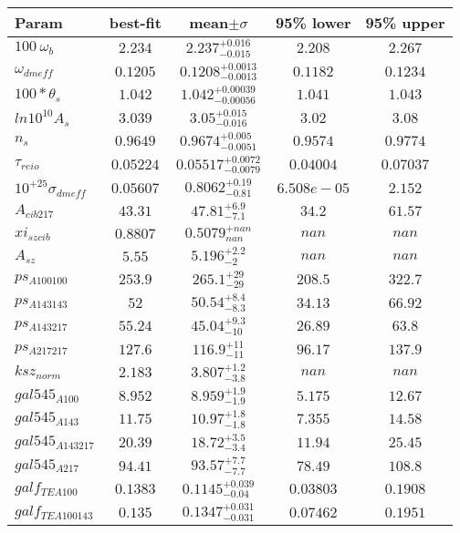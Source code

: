 \begin{tabular}{|l|c|c|c|c|} 
 \hline 
Param & best-fit & mean$\pm\sigma$ & 95\% lower & 95\% upper \\ \hline 
$100~\omega{}_{b }$ &$2.234$ & $2.237_{-0.015}^{+0.016}$ & $2.208$ & $2.267$ \\ 
$\omega{}_{dmeff }$ &$0.1205$ & $0.1208_{-0.0013}^{+0.0013}$ & $0.1182$ & $0.1234$ \\ 
$100*\theta{}_{s }$ &$1.042$ & $1.042_{-0.00056}^{+0.00039}$ & $1.041$ & $1.043$ \\ 
$ln10^{10}A_{s }$ &$3.039$ & $3.05_{-0.016}^{+0.015}$ & $3.02$ & $3.08$ \\ 
$n_{s }$ &$0.9649$ & $0.9674_{-0.0051}^{+0.005}$ & $0.9574$ & $0.9774$ \\ 
$\tau{}_{reio }$ &$0.05224$ & $0.05517_{-0.0079}^{+0.0072}$ & $0.04004$ & $0.07037$ \\ 
$10^{+25}\sigma{}_{dmeff }$ &$0.05607$ & $0.8062_{-0.81}^{+0.19}$ & $6.508e-05$ & $2.152$ \\ 
$A_{cib 217 }$ &$43.31$ & $47.81_{-7.1}^{+6.9}$ & $34.2$ & $61.57$ \\ 
$xi_{sz cib }$ &$0.8807$ & $0.5079_{nan}^{+nan}$ & $nan$ & $nan$ \\ 
$A_{sz }$ &$5.55$ & $5.196_{-2}^{+2.2}$ & $nan$ & $nan$ \\ 
$ps_{A 100 100 }$ &$253.9$ & $265.1_{-29}^{+29}$ & $208.5$ & $322.7$ \\ 
$ps_{A 143 143 }$ &$52$ & $50.54_{-8.3}^{+8.4}$ & $34.13$ & $66.92$ \\ 
$ps_{A 143 217 }$ &$55.24$ & $45.04_{-10}^{+9.3}$ & $26.89$ & $63.8$ \\ 
$ps_{A 217 217 }$ &$127.6$ & $116.9_{-11}^{+11}$ & $96.17$ & $137.9$ \\ 
$ksz_{norm }$ &$2.183$ & $3.807_{-3.8}^{+1.2}$ & $nan$ & $nan$ \\ 
$gal545_{A 100 }$ &$8.952$ & $8.959_{-1.9}^{+1.9}$ & $5.175$ & $12.67$ \\ 
$gal545_{A 143 }$ &$11.75$ & $10.97_{-1.8}^{+1.8}$ & $7.355$ & $14.58$ \\ 
$gal545_{A 143 217 }$ &$20.39$ & $18.72_{-3.4}^{+3.5}$ & $11.94$ & $25.45$ \\ 
$gal545_{A 217 }$ &$94.41$ & $93.57_{-7.7}^{+7.7}$ & $78.49$ & $108.8$ \\ 
$galf_{TE A 100 }$ &$0.1383$ & $0.1145_{-0.04}^{+0.039}$ & $0.03803$ & $0.1908$ \\ 
$galf_{TE A 100 143 }$ &$0.135$ & $0.1347_{-0.031}^{+0.031}$ & $0.07462$ & $0.1951$ \\ 

\end{tabular}
